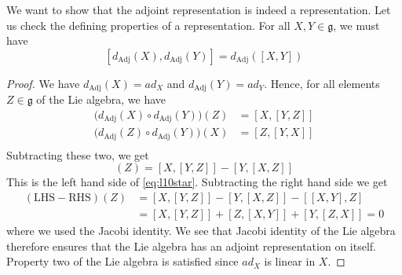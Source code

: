 \begin{claim}
  We want to show that the adjoint representation is indeed a representation.
  Let us check the defining properties of a representation.
  For all $X, Y \in \mathfrak{g}$, we must have
  \begin{equation}
    \label{eq:l10star}
    [d_{\text{Adj}}(X), d_{\text{Adj}}(Y)] = d_{\text{Adj}}([X, Y])
  \end{equation}
\end{claim}
\begin{proof}
  We have $d_{\text{Adj}}(X) = ad_X$ and $d_{\text{Adj}}(Y) = ad_Y$.
  Hence, for all elements $Z \in \mathfrak{g}$ of the Lie algebra, we have
  \begin{align}
    \bigl(d_{\text{Adj}}(X) \circ d_{\text{Adj}}(Y) \bigr)(Z) &= [X, [Y, Z]] \\
    \bigl(d_{\text{Adj}}(Z) \circ d_{\text{Adj}}(Y) \bigr)(X) &= [Z, [Y, X]] \\
  \end{align}
  Subtracting these two, we get
  \begin{equation}
    [d_{\text{Adj}}(X), d_{\text{Adj}}(Y)](Z) = [X, [Y, Z]] - [Y, [X, Z]]
  \end{equation}
  This is the left hand side of \eqref{eq:l10star}. Subtracting the right hand side we get
  \begin{align}
    (\text{LHS}- \text{RHS}) (Z) &= [X, [Y, Z]] - [Y, [X, Z] ] - [[X, Y], Z] \\
				 &= [X, [Y, Z] ] + [Z, [X, Y] ] + [Y, [Z, X] ]= 0
  \end{align}
  where we used the Jacobi identity.
  We see that Jacobi identity of the Lie algebra therefore ensures that the Lie algebra has an adjoint representation on itself.
  Property two of the Lie algebra is satisfied since $ad_X$ is linear in $X$.
\end{proof}

